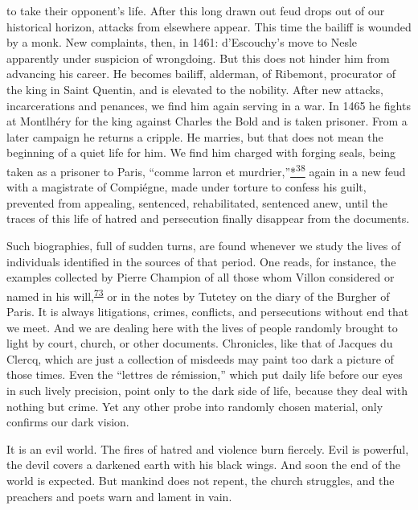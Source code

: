 to take their opponent's life. After this long drawn out feud drops out
of our historical horizon, attacks from elsewhere appear. This time the
bailiff is wounded by a monk. New complaints, then, in 1461:
d'Escouchy's move to Nesle apparently under suspicion of wrongdoing. But
this does not hinder him from advancing his career. He becomes bailiff,
alderman, of Ribemont, procurator of the king in Saint Quentin, and is
elevated to the nobility. After new attacks, incarcerations and
penances, we find him again serving in a war. In 1465 he fights at
Montlhéry for the king against Charles the Bold and is taken prisoner.
From a later campaign he returns a cripple. He marries, but that does
not mean the beginning of a quiet life for him. We find him charged with
forging seals, being
\protect\hypertarget{08_Chapter_One__THE_PASSIONATE_INTE.xhtmlux5cux23page_29}{}{}taken
as a prisoner to Paris, ``comme larron et
murdrier,''\protect\hypertarget{08_Chapter_One__THE_PASSIONATE_INTE.xhtmlux5cux23id_2409}{\protect\hyperlink{23_NOTES.xhtmlux5cux23id_2410}{*\textsuperscript{38}}}
again in a new feud with a magistrate of Compiégne, made under torture
to confess his guilt, prevented from appealing, sentenced,
rehabilitated, sentenced anew, until the traces of this life of hatred
and persecution finally disappear from the documents.

Such biographies, full of sudden turns, are found whenever we study the
lives of individuals identified in the sources of that period. One
reads, for instance, the examples collected by Pierre Champion of all
those whom Villon considered or named in his
will,\textsuperscript{\protect\hypertarget{08_Chapter_One__THE_PASSIONATE_INTE.xhtmlux5cux23id_2086}{\protect\hyperlink{23_NOTES.xhtmlux5cux23id_2087}{73}}}
or in the notes by Tutetey on the diary of the Burgher of Paris. It is
always litigations, crimes, conflicts, and persecutions without end that
we meet. And we are dealing here with the lives of people randomly
brought to light by court, church, or other documents. Chronicles, like
that of Jacques du Clercq, which are just a collection of misdeeds may
paint too dark a picture of those times. Even the ``lettres de
rémission,'' which put daily life before our eyes in such lively
precision, point only to the dark side of life, because they deal with
nothing but crime. Yet any other probe into randomly chosen material,
only confirms our dark vision.

It is an evil world. The fires of hatred and violence burn fiercely.
Evil is powerful, the devil covers a darkened earth with his black
wings. And soon the end of the world is expected. But mankind does not
repent, the church struggles, and the preachers and poets warn and
lament in vain.